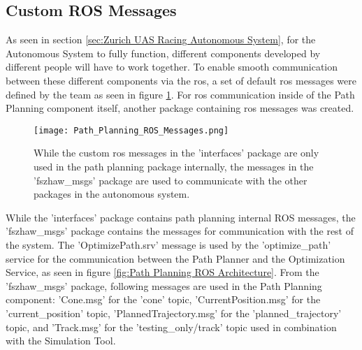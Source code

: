 \subsection{Custom ROS Messages} \label{sec:Custom ROS Messages}
As seen in section \ref{sec:Zurich UAS Racing Autonomous System}, for the Autonomous System to fully function, different components developed by different people will have to work together. To enable smooth communication between these different components via the \acrlong{ros}, a set of default \acrshort{ros} messages were defined by the team as seen in figure \ref{fig:Path Planning ROS Messages}. For \acrshort{ros} communication inside of the Path Planning component itself, another package containing \acrshort{ros} messages was created.
\begin{figure}[H]
    \centering
    \texttt{[image: Path\_Planning\_ROS\_Messages.png]}
    \caption{While the custom \acrshort{ros} messages in the 'interfaces' package are only used in the path planning package internally, the messages in the 'fszhaw\_msgs' package are used to communicate with the other packages in the autonomous system.}
    \label{fig:Path Planning ROS Messages}
\end{figure}
While the 'interfaces' package contains path planning internal ROS messages, the 'fszhaw\_msgs' package contains the messages for communication with the rest of the system. The 'OptimizePath.srv' message is used by the 'optimize\_path' service for the communication between the Path Planner and the Optimization Service, as seen in figure \ref{fig:Path Planning ROS Architecture}. From the 'fszhaw\_msgs' package, following messages are used in the Path Planning component: 'Cone.msg' for the 'cone' topic, 'CurrentPosition.msg' for the 'current\_position' topic, 'PlannedTrajectory.msg' for the 'planned\_trajectory' topic, and 'Track.msg' for the 'testing\_only/track' topic used in combination with the Simulation Tool.

